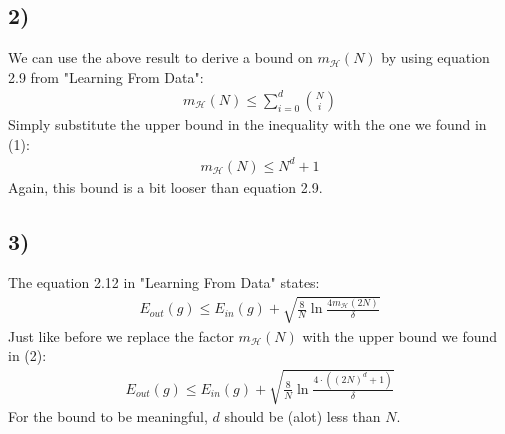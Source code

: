 \documentclass[a4paper]{article}
\begin{document}
\subsection*{2)}
We can use the above result to derive a bound on $m_\mathcal{H}(N)$ by using equation 2.9 from "Learning From Data":
\begin{align*}
m_\mathcal{H}(N)\leq \sum_{i=0}^d \binom{N}{i}
\end{align*}
Simply substitute the upper bound in the inequality with the one we found in (1):
\begin{align*}
m_\mathcal{H}(N)\leq N^d+1
\end{align*}
Again, this bound is a bit looser than equation 2.9.

\subsection*{3)}
The equation 2.12 in "Learning From Data" states:
\begin{align*}
E_{out}(g)\leq E_{in}(g)+\sqrt{\frac{8}{N}\ln \frac{4m_{\mathcal{H}}(2N)}{\delta}}
\end{align*}
Just like before we replace the factor $m_\mathcal{H}(N)$ with the upper bound we found in (2):
\begin{align*}
E_{out}(g)\leq E_{in}(g)+\sqrt{\frac{8}{N}\ln \frac{4\cdot ((2N)^d+1)}{\delta}}
\end{align*}
For the bound to be meaningful, $d$ should be (alot) less than $N$.
\end{document}
